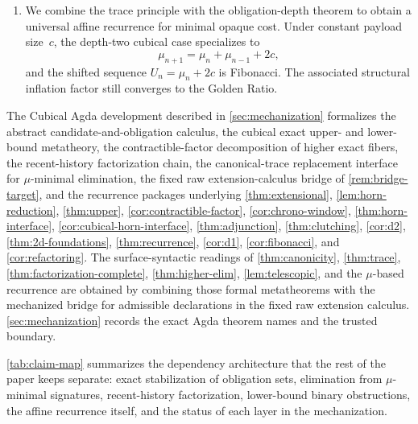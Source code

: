 \documentclass{lmcs}
\begin{document}
\begin{enumerate}
    \item We combine the trace principle with the obligation-depth theorem to obtain a universal affine recurrence for minimal opaque cost. Under constant payload size~$c$, the depth-two cubical case specializes to
    \[
      \mu_{n+1} = \mu_n + \mu_{n-1} + 2c,
    \]
    and the shifted sequence $U_n=\mu_n+2c$ is Fibonacci. The associated structural inflation factor still converges to the Golden Ratio.
\end{enumerate}

The Cubical Agda development described in \autoref{sec:mechanization} formalizes the abstract candidate-and-obligation calculus, the cubical exact upper- and lower-bound metatheory, the contractible-factor decomposition of higher exact fibers, the recent-history factorization chain, the canonical-trace replacement interface for $\mu$-minimal elimination, the fixed raw extension-calculus bridge of \autoref{rem:bridge-target}, and the recurrence packages underlying \autoref{thm:extensional}, \autoref{lem:horn-reduction}, \autoref{thm:upper}, \autoref{cor:contractible-factor}, \autoref{cor:chrono-window}, \autoref{thm:horn-interface}, \autoref{cor:cubical-horn-interface}, \autoref{thm:adjunction}, \autoref{thm:clutching}, \autoref{cor:d2}, \autoref{thm:2d-foundations}, \autoref{thm:recurrence}, \autoref{cor:d1}, \autoref{cor:fibonacci}, and \autoref{cor:refactoring}. The surface-syntactic readings of \autoref{thm:canonicity}, \autoref{thm:trace}, \autoref{thm:factorization-complete}, \autoref{thm:higher-elim}, \autoref{lem:telescopic}, and the $\mu$-based recurrence are obtained by combining those formal metatheorems with the mechanized bridge for admissible declarations in the fixed raw extension calculus. \autoref{sec:mechanization} records the exact Agda theorem names and the trusted boundary.

\autoref{tab:claim-map} summarizes the dependency architecture that the rest of the paper keeps separate: exact stabilization of obligation sets, elimination from $\mu$-minimal signatures, recent-history factorization, lower-bound binary obstructions, the affine recurrence itself, and the status of each layer in the mechanization.
\end{document}
